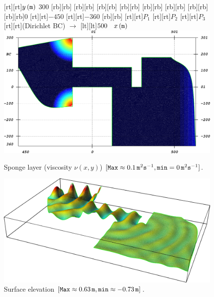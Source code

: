 \begin{figure}[htb!]
{\centering
{}[rt][rt]{$y\, ({\tt m})$\,\,$300$}
[rb][rb]{}
[rb][rb]{}
[rb][rb]{}
[rb][rb]{}
[rb][rb]{}
[rb][rb]{}
[rb][rb]{}
[rb][rb]{0}
[rt][rt]{$-450$}
[rt][rt]{$-360$}
[rb][rb]{}
[rt][rt]{\color{white}$P_1$}
[rt][rt]{\color{white}$P_2$}
[rt][rt]{\color{white}$P_3$}
[rt][rt]{(Dirichlet BC) \(\longrightarrow\)}
[lt][lt]{$500\quad x\, ({\tt m})$}
\includegraphics[width=\largewidth]{chapters/lopes/pdf/sponge.pdf}
\caption{Sponge layer (viscosity \(\nu(x,y)\)) \([{\tt Max} \approx 0.1\,{\tt m}^2{\tt
s}^{-1}, {\tt min}=0 \,{\tt m}^2{\tt s}^{-1}]\).}\label{lopes:fig:sponge}\par}
\end{figure}
\begin{figure}[!htb]
{\centering
\includegraphics[width=\largewidth]{chapters/lopes/pdf/eta.pdf}
\caption{Surface elevation \([{\tt Max}\approx 0.63\,{\tt
m}, {\tt min}\approx-0.73\,{\tt m}] \).}\label{lopes:fig:elevation}\par}
\end{figure}
